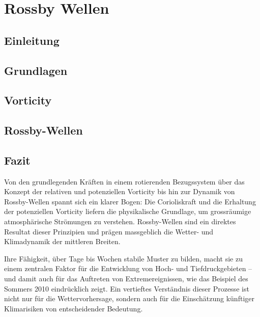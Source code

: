 %
%
%

\chapter{Rossby Wellen\label{chapter:rossby}}
\begin{refsection}

    \section{Einleitung}
    
    \section{Grundlagen}
    
    \section{Vorticity}
    
    \section{Rossby-Wellen}
    


	\section{Fazit}

	Von den grundlegenden Kräften in einem rotierenden Bezugssystem über das Konzept der relativen und potenziellen Vorticity bis hin zur Dynamik von Rossby-Wellen spannt sich ein klarer Bogen:
	Die Corioliskraft und die Erhaltung der potenziellen Vorticity liefern die physikalische Grundlage, um grossräumige atmosphärische Strömungen zu verstehen.
	Rossby-Wellen sind ein direktes Resultat dieser Prinzipien und prägen massgeblich die Wetter- und Klimadynamik der mittleren Breiten.

	Ihre Fähigkeit, über Tage bis Wochen stabile Muster zu bilden, macht sie zu einem zentralen Faktor für die Entwicklung von Hoch- und Tiefdruckgebieten – und damit auch für das Auftreten von Extremereignissen, wie das Beispiel des Sommers 2010 eindrücklich zeigt.
	Ein vertieftes Verständnis dieser Prozesse ist nicht nur für die Wettervorhersage, sondern auch für die Einschätzung künftiger Klimarisiken von entscheidender Bedeutung.


	\printbibliography[heading=subbibliography]
\end{refsection}
